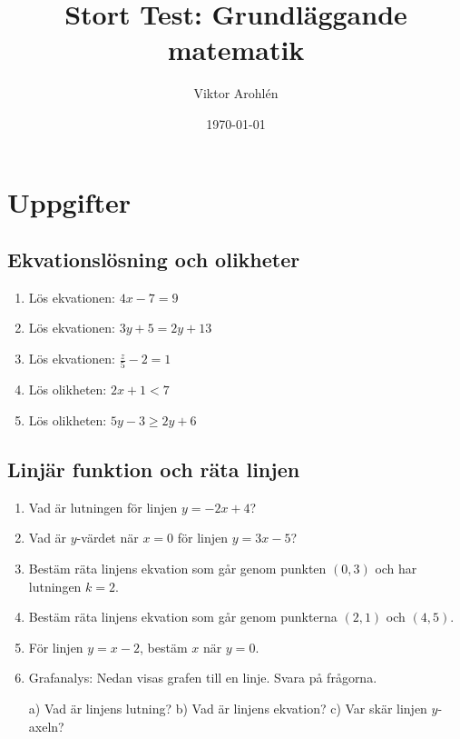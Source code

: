 \documentclass[a4paper,11pt]{article}
\title{Stort Test: Grundläggande matematik}
\author{Viktor Arohlén}
\date{\today}
\begin{document}
\maketitle

\section*{Uppgifter}

\subsection*{Ekvationslösning och olikheter}
\begin{enumerate}[label=\textbf{1.\arabic*.}]
    \item Lös ekvationen: $4x - 7 = 9$
    \item Lös ekvationen: $3y + 5 = 2y + 13$
    \item Lös ekvationen: $\frac{z}{5} - 2 = 1$
    \item Lös olikheten: $2x + 1 < 7$
    \item Lös olikheten: $5y - 3 \geq 2y + 6$
\end{enumerate}

\subsection*{Linjär funktion och räta linjen}
\begin{enumerate}[label=\textbf{2.\arabic*.}]
    \item Vad är lutningen för linjen $y = -2x + 4$?
    \item Vad är $y$-värdet när $x = 0$ för linjen $y = 3x - 5$?
    \item Bestäm räta linjens ekvation som går genom punkten $(0,3)$ och har lutningen $k=2$.
    \item Bestäm räta linjens ekvation som går genom punkterna $(2,1)$ och $(4,5)$.
    \item För linjen $y = x - 2$, bestäm $x$ när $y = 0$.
    \item Grafanalys: Nedan visas grafen till en linje. Svara på frågorna.
    \begin{center}
    \end{center}
    a) Vad är linjens lutning?
    b) Vad är linjens ekvation?
    c) Var skär linjen $y$-axeln?
\end{enumerate}
\end{document}
